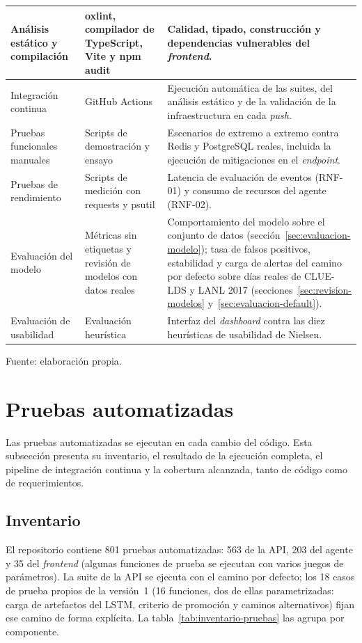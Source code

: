 \begin{longtable}{>{\raggedright\arraybackslash}p{3.3cm}>{\raggedright\arraybackslash}p{4.2cm}>{\raggedright\arraybackslash}p{6.6cm}}
	\hline
	Análisis estático y compilación & oxlint, compilador de TypeScript, Vite y npm audit & Calidad, tipado, construcción y dependencias vulnerables del \emph{frontend}. \\
	\hline
	Integración continua & GitHub Actions & Ejecución automática de las suites, del análisis estático y de la validación de la infraestructura en cada \emph{push}. \\
	\hline
	Pruebas funcionales manuales & Scripts de demostración y ensayo & Escenarios de extremo a extremo contra Redis y PostgreSQL reales, incluida la ejecución de mitigaciones en el \emph{endpoint}. \\
	\hline
	Pruebas de rendimiento & Scripts de medición con requests y psutil & Latencia de evaluación de eventos (RNF-01) y consumo de recursos del agente (RNF-02). \\
	\hline
	Evaluación del modelo & Métricas sin etiquetas y revisión de modelos con datos reales & Comportamiento del modelo sobre el conjunto de datos (sección~\ref{sec:evaluacion-modelo}); tasa de falsos positivos, estabilidad y carga de alertas del camino por defecto sobre días reales de CLUE-LDS y LANL 2017 (secciones~\ref{sec:revision-modelos} y~\ref{sec:evaluacion-default}). \\
	\hline
	Evaluación de usabilidad & Evaluación heurística & Interfaz del \emph{dashboard} contra las diez heurísticas de usabilidad de Nielsen. \\
	\hline
\end{longtable}
{\small Fuente: elaboración propia.\par}

\section{Pruebas automatizadas}
\label{sec:pruebas-automatizadas}

Las pruebas automatizadas se ejecutan en cada cambio del código. Esta subsección presenta su inventario, el resultado de la ejecución completa, el pipeline de integración continua y la cobertura alcanzada, tanto de código como de requerimientos.


\subsection{Inventario}
El repositorio contiene 801 pruebas automatizadas: 563 de la API, 203 del agente y 35 del \emph{frontend} (algunas funciones de prueba se ejecutan con varios juegos de parámetros). La suite de la API se ejecuta con el camino por defecto; los 18 casos de prueba propios de la versión~1 (16 funciones, dos de ellas parametrizadas: carga de artefactos del LSTM, criterio de promoción y caminos alternativos) fijan ese camino de forma explícita. La tabla~\ref{tab:inventario-pruebas} las agrupa por componente.

